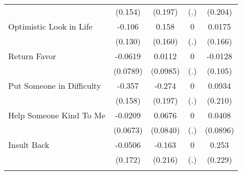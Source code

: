 {\begin{tabular}{l*{4}{c}}
            &     (0.154)         &     (0.197)         &         (.)         &     (0.204)         \\
[1em]
Optimistic Look in Life&      -0.106         &       0.158         &           0         &      0.0175         \\
            &     (0.130)         &     (0.160)         &         (.)         &     (0.166)         \\
[1em]
Return Favor&     -0.0619         &      0.0112         &           0         &     -0.0128         \\
            &    (0.0789)         &    (0.0985)         &         (.)         &     (0.105)         \\
[1em]
Put Someone in Difficulty&      -0.357\sym{*}  &      -0.274         &           0         &      0.0934         \\
            &     (0.158)         &     (0.197)         &         (.)         &     (0.210)         \\
[1em]
Help Someone Kind To Me&     -0.0209         &      0.0676         &           0         &      0.0408         \\
            &    (0.0673)         &    (0.0840)         &         (.)         &    (0.0896)         \\
[1em]
Insult Back &     -0.0506         &      -0.163         &           0         &       0.253         \\
            &     (0.172)         &     (0.216)         &         (.)         &     (0.229)         \\
\hline\hline
{}\\
\end{tabular}
}
